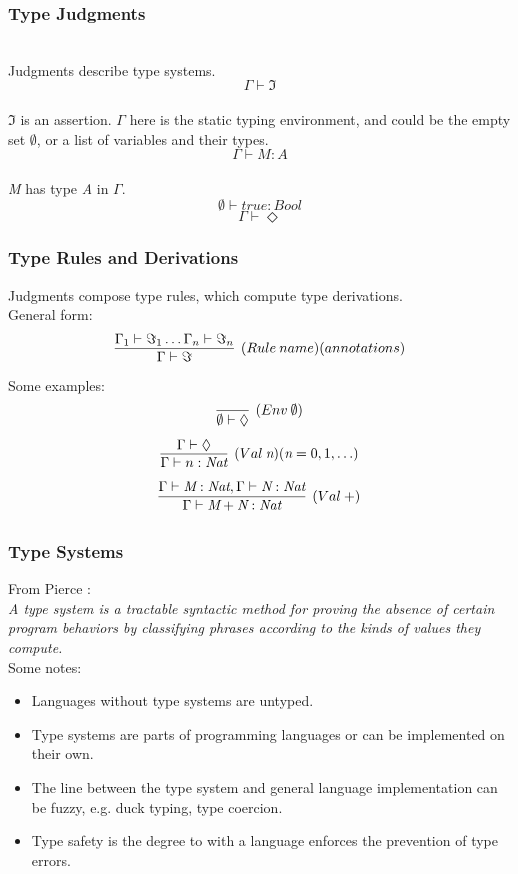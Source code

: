 \documentclass{beamer}
\newcommand{\G}{\Gamma}
\newcommand{\entails}{\vdash}
\begin{document}
\begin{frame}
  \frametitle{Type Judgments}
  \\
  \vspace{20pt}
  Judgments describe type systems.\\
  \[ \G \entails \Im \]\\
  $\Im$ is an assertion. $\Gamma$ here is the static typing environment, and
  could be the empty set $\emptyset$, or a list of variables and their types.\\
  \[ \G \entails \textit{M} : \textit{A} \]\\
  \textit{M} has type \textit{A} in $\Gamma$.\\
  \[ \emptyset \entails \textit{true} : \textit{Bool} \]
  \[ \G \entails \Diamond \]
\end{frame}

\begin{frame}
  \frametitle{Type Rules and Derivations}
  \vspace{20pt}
  Judgments compose type rules, which compute type derivations.\\
  \vspace{10pt}
  General form:
  \[ \infer[(Rule\:name)(annotations)]{\Gamma \entails \Im}{\Gamma_1 \entails \Im_1
      \ldots \Gamma_n \entails \Im_n} \]
  Some examples:
  \vspace{2pt}
  \[ \infer[(Env\:\emptyset)]{\emptyset \entails \Diamond}{} \]
  \vspace{2pt}
  \[ \infer[(Val\:\textit{n})(\textit{n} = 0,1,\ldots)]{\G \entails n :
      \textit{Nat}}{\G \entails \Diamond} \]
  \vspace{2pt}
  \[ \infer[(Val\:+)]{\G \entails \textit{M} + \textit{N} : \textit{Nat}}{\G
      \entails \textit{M} : \textit{Nat}, \G \entails \textit{N} : \textit{Nat}} \]
\end{frame}

\begin{frame}
  \frametitle{Type Systems}
  From Pierce \cite{TAPL}:\\
  \textit{A type system is a tractable syntactic method for proving the absence
    of certain program behaviors by classifying phrases according to the kinds
    of values they compute.}\\
  \vspace{20pt}
  Some notes:\\
  \begin{itemize}
    \item Languages without type systems are untyped.
    \item Type systems are parts of programming languages or can be implemented
      on their own.
    \item The line between the type system and general language implementation
      can be fuzzy, e.g. duck typing, type coercion.
    \item Type safety is the degree to with a language enforces the prevention
      of type errors.
  \end{itemize}
\end{frame}
\end{document}
